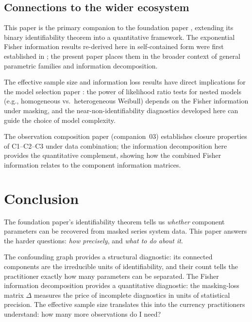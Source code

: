 \documentclass[11pt]{article}
\theoremstyle{definition}
\theoremstyle{plain}
\begin{document}
\subsection{Connections to the wider ecosystem}

This paper is the primary companion to the foundation paper
\citep{towell2025masked}, extending its binary identifiability theorem
into a quantitative framework.
The exponential Fisher information results re-derived here in
self-contained form were first established in
\citet{towell2026exponential}; the present paper places them in
the broader context of general parametric families and information
decomposition.

The effective sample size and information loss results have direct
implications for the model selection paper
\citep{towell2026model-selection}: the power of likelihood ratio
tests for nested models (e.g., homogeneous vs.\ heterogeneous Weibull)
depends on the Fisher information under masking, and the
near-non-identifiability diagnostics developed here can guide the
choice of model complexity.

The observation composition paper (companion~03) establishes
closure properties of C1--C2--C3 under data combination; the
information decomposition here provides the quantitative complement,
showing how the combined Fisher information relates to the component
information matrices.



\section{Conclusion}
\label{sec:conclusion}

The foundation paper's identifiability theorem tells us \emph{whether}
component parameters can be recovered from masked series system data.
This paper answers the harder questions: \emph{how precisely}, and
\emph{what to do about it}.

The confounding graph provides a structural diagnostic: its connected
components are the irreducible units of identifiability, and their
count tells the practitioner exactly how many parameters can be
separated.
The Fisher information decomposition provides a quantitative
diagnostic: the masking-loss matrix $\Delta$ measures the price of
incomplete diagnostics in units of statistical precision.
The effective sample size translates this into the currency
practitioners understand: how many more observations do I need?
\end{document}
